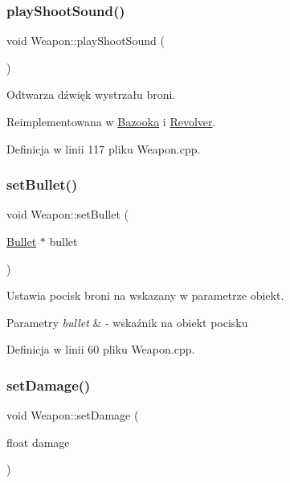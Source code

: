 \subsubsection{\texorpdfstring{play\+Shoot\+Sound()}{playShootSound()}}
{\footnotesize\ttfamily void Weapon\+::play\+Shoot\+Sound (\begin{DoxyParamCaption}{ }\end{DoxyParamCaption})\hspace{0.3cm}{\ttfamily [virtual]}}



Odtwarza dźwięk wystrzału broni. 



Reimplementowana w \mbox{\hyperlink{class_bazooka_a2645b8043766ec5045e82d452828acdd}{Bazooka}} i \mbox{\hyperlink{class_revolver_acc5cf142969078c7ee588582cd7c9316}{Revolver}}.



Definicja w linii 117 pliku Weapon.\+cpp.

\mbox{\label{class_weapon_addd624ea7d811b1bf61c2abb4a812f87}} 
\subsubsection{\texorpdfstring{set\+Bullet()}{setBullet()}}
{\footnotesize\ttfamily void Weapon\+::set\+Bullet (\begin{DoxyParamCaption}\item[{\mbox{\hyperlink{class_bullet}{Bullet}} $\ast$}]{bullet }\end{DoxyParamCaption})}



Ustawia pocisk broni na wskazany w parametrze obiekt. 


\begin{DoxyParams}{Parametry}
{\em bullet} & -\/ wskaźnik na obiekt pocisku \\
\hline
\end{DoxyParams}


Definicja w linii 60 pliku Weapon.\+cpp.

\mbox{\label{class_weapon_a00809195a729c5efc854a0fe6dda72aa}} 
\subsubsection{\texorpdfstring{set\+Damage()}{setDamage()}}
{\footnotesize\ttfamily void Weapon\+::set\+Damage (\begin{DoxyParamCaption}\item[{float}]{damage }\end{DoxyParamCaption})}



